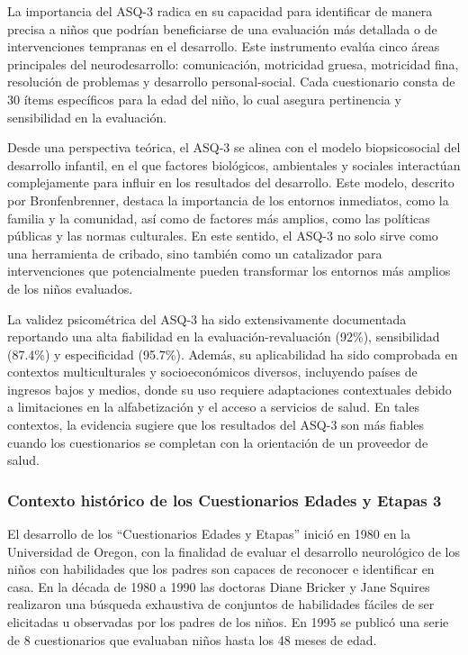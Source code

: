 \documentclass[11pt,letterpaper]{report}
\begin{document}
La importancia del ASQ-3 radica en su capacidad para identificar de manera
precisa a niños que podrían beneficiarse de una evaluación más detallada o de
intervenciones tempranas en el desarrollo. Este instrumento evalúa cinco áreas
principales del neurodesarrollo: comunicación, motricidad gruesa, motricidad
fina, resolución de problemas y desarrollo personal-social. Cada cuestionario
consta de 30 ítems específicos para la edad del niño, lo cual asegura
pertinencia y sensibilidad en la evaluación. \cite{squires2009ages}

Desde una perspectiva teórica, el ASQ-3 se alinea con el modelo
biopsicosocial del desarrollo infantil, en el que factores biológicos,
ambientales y sociales interactúan complejamente para influir en los
resultados del desarrollo. Este modelo, descrito por Bronfenbrenner, destaca la
importancia de los entornos inmediatos, como la familia y la comunidad, así
como de factores más amplios, como las políticas públicas y las normas
culturales. En este sentido, el ASQ-3 no solo sirve como una herramienta de
cribado, sino también como un catalizador para intervenciones que
potencialmente pueden transformar los entornos más amplios de los niños
evaluados. \cite{Feldman3, Bronfenbrenner2005}

La validez psicométrica del ASQ-3 ha sido extensivamente documentada reportando
una alta fiabilidad en la evaluación-revaluación (92\%), sensibilidad (87.4\%)
y especificidad (95.7\%). Además, su aplicabilidad ha sido comprobada en
contextos multiculturales y socioeconómicos diversos, incluyendo países de
ingresos bajos y medios, donde su uso requiere adaptaciones contextuales debido
a limitaciones en la alfabetización y el acceso a servicios de salud. En tales
contextos, la evidencia sugiere que los resultados del ASQ-3 son más fiables
cuando los cuestionarios se completan con la orientación de un proveedor de
salud. \cite{Vameghi2013-uo, SarmientoCampos2010, Manasyan2023}

\subsubsection{Contexto histórico de los Cuestionarios Edades y Etapas 3}
El desarrollo de los ``Cuestionarios Edades y Etapas'' inició en 1980 en la
Universidad de Oregon, con la finalidad de evaluar el desarrollo neurológico de
los niños con habilidades que los padres son capaces de reconocer e identificar
en casa. En la década de 1980 a 1990 las doctoras Diane Bricker y Jane Squires
realizaron una búsqueda exhaustiva de conjuntos de habilidades fáciles de ser
elicitadas u observadas por los padres de los niños. En 1995 se publicó una
serie de 8 cuestionarios que evaluaban niños hasta los 48 meses de edad.
\cite{ASQ4decades}
\end{document}
